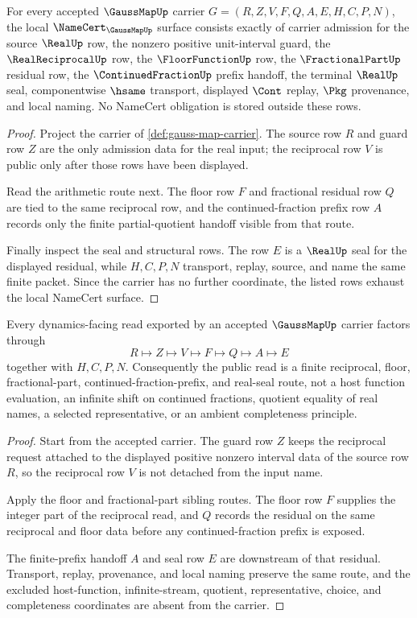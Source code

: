 \begin{theorem}
\label{thm:gauss-map-namecert-obligations}
For every accepted $\GaussMapUp$ carrier $G=(R,Z,V,F,Q,A,E,H,C,P,N)$, the local $\NameCert_{\GaussMapUp}$ surface consists exactly of carrier admission for the source $\RealUp$ row, the nonzero positive unit-interval guard, the $\RealReciprocalUp$ row, the $\FloorFunctionUp$ row, the $\FractionalPartUp$ residual row, the $\ContinuedFractionUp$ prefix handoff, the terminal $\RealUp$ seal, componentwise $\hsame$ transport, displayed $\Cont$ replay, $\Pkg$ provenance, and local naming. No NameCert obligation is stored outside these rows.
\end{theorem}
\begin{proof}
Project the carrier of \autoref{def:gauss-map-carrier}. The source row $R$ and guard row $Z$ are the only admission data for the real input; the reciprocal row $V$ is public only after those rows have been displayed.

Read the arithmetic route next. The floor row $F$ and fractional residual row $Q$ are tied to the same reciprocal row, and the continued-fraction prefix row $A$ records only the finite partial-quotient handoff visible from that route.

Finally inspect the seal and structural rows. The row $E$ is a $\RealUp$ seal for the displayed residual, while $H,C,P,N$ transport, replay, source, and name the same finite packet. Since the carrier has no further coordinate, the listed rows exhaust the local NameCert surface.
\end{proof}

\begin{theorem}
\label{thm:gauss-map-fractional-part-route}
Every dynamics-facing read exported by an accepted $\GaussMapUp$ carrier factors through
$$
R\longmapsto Z\longmapsto V\longmapsto F\longmapsto Q\longmapsto A\longmapsto E
$$
together with $H,C,P,N$. Consequently the public read is a finite reciprocal, floor, fractional-part, continued-fraction-prefix, and real-seal route, not a host function evaluation, an infinite shift on continued fractions, quotient equality of real names, a selected representative, or an ambient completeness principle.
\end{theorem}
\begin{proof}
Start from the accepted carrier. The guard row $Z$ keeps the reciprocal request attached to the displayed positive nonzero interval data of the source row $R$, so the reciprocal row $V$ is not detached from the input name.

Apply the floor and fractional-part sibling routes. The floor row $F$ supplies the integer part of the reciprocal read, and $Q$ records the residual on the same reciprocal and floor data before any continued-fraction prefix is exposed.

The finite-prefix handoff $A$ and seal row $E$ are downstream of that residual. Transport, replay, provenance, and local naming preserve the same route, and the excluded host-function, infinite-stream, quotient, representative, choice, and completeness coordinates are absent from the carrier.
\end{proof}

